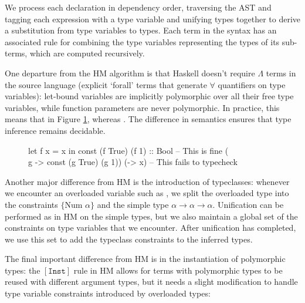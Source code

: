 \documentclass[dissertation.tex]{subfiles}
\begin{document}
{{{            We process each declaration in dependency order, traversing the AST and tagging each expression with a type
            variable and unifying types together to derive a substitution from type variables to types. Each term in the
            syntax has an associated rule for combining the type variables representing the types of its sub-terms,
            which are computed recursively.

            One departure from the HM algorithm is that Haskell doesn't require \(\Lambda\) terms in the source language
            (explicit `forall' terms that generate \(\forall\) quantifiers on type variables): let-bound variables are
            implicitly polymorphic over all their free type variables, while function parameters are never polymorphic.
            In practice, this means that in Figure \ref{code:polymorphic-let},  whereas . The difference in semantics
            ensures that type inference remains decidable.
 
            \begin{figure}[h]
            \begin{haskellfigure}
            let f x = x in const (f True) (f 1) :: Bool -- This is fine
            (\\g -> const (g True) (g 1)) (\x -> x)     -- This fails to typecheck
            \end{haskellfigure}
            \caption{}
            \label{code:polymorphic-let}
            \end{figure}
            
            Another major difference from HM is the introduction of typeclasses: whenever we encounter an overloaded
            variable such as \haskell{+}, we split the overloaded type into the constraints \(\{\text{Num }\alpha\}\)
            and the simple type \(\alpha\rightarrow\alpha\rightarrow\alpha\). Unification can be performed as in HM on
            the simple types, but we also maintain a global set of the constraints on type variables that we encounter.
            After unification has completed, we use this set to add the typeclass constraints to the inferred types.

            The final important difference from HM is in the instantiation of polymorphic types: the \([\texttt{Inst}]\)
            rule in HM allows for terms with polymorphic types to be reused with different argument types, but it needs
            a slight modification to handle type variable constraints introduced by overloaded types:
            
}}}
\end{document}
